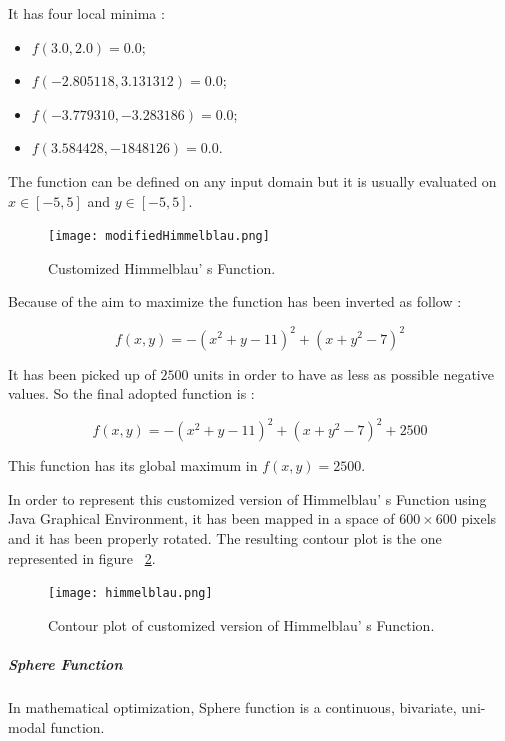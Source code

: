 It has four local minima :

\begin{itemize}
	\item $f(3.0, 2.0) = 0.0$;
	\item $f(-2.805118, 3.131312) = 0.0$;
	\item $f(-3.779310, -3.283186) = 0.0$;
	\item $f(3.584428, -1848126) = 0.0$.
\end{itemize}
	
The function can be defined on any input domain but it is usually evaluated on $x \in [-5, 5]$ and $y \in [-5, 5]$.

\begin{figure}[h!]
	\centering
	\texttt{[image: modifiedHimmelblau.png]}
	\caption{Customized Himmelblau' s Function.}
	\label{fig:CustomizedHimmelblauFunction}
\end{figure}

Because of the aim to maximize the function has been inverted as follow :

\begin{equation}
f(x, y) = -(x^2 + y -11)^2 + (x + y^2 - 7)^2
\end{equation}

It has been picked up of $2500$ units in order to have as less as possible negative values. So the final adopted function is :
 
\begin{equation}
f(x, y) = -(x^2 + y -11)^2 + (x + y^2 - 7)^2 + 2500
\end{equation}

This function has its global maximum in $f(x, y) = 2500$. 

In order to represent this customized version of Himmelblau' s Function using Java Graphical Environment, it has been mapped in a space of $600 \times 600$ pixels and it has been properly rotated. The resulting contour plot is the one represented in figure ~\ref{fig:ContourPlotCustomizedHimmelblauFunction}. \\

\begin{figure}[h!]
	\centering
	\texttt{[image: himmelblau.png]}
	\caption{Contour plot of customized version of Himmelblau' s Function.}
	\label{fig:ContourPlotCustomizedHimmelblauFunction}
\end{figure}
 
\subparagraph{Sphere Function} In mathematical optimization, Sphere function is a continuous, bivariate, uni-modal function. \\

